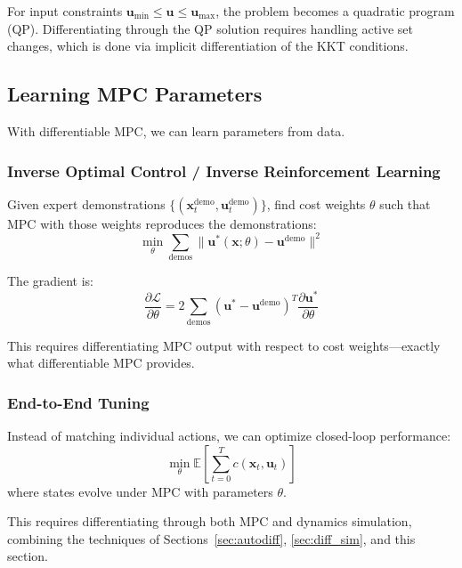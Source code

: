 For input constraints $\mathbf{u}_{\min} \leq \mathbf{u} \leq \mathbf{u}_{\max}$, the problem becomes a quadratic program (QP). Differentiating through the QP solution requires handling active set changes, which is done via implicit differentiation of the KKT conditions.

\subsection{Learning MPC Parameters}

With differentiable MPC, we can learn parameters from data.

\subsubsection{Inverse Optimal Control / Inverse Reinforcement Learning}

Given expert demonstrations $\{(\mathbf{x}_t^{\text{demo}}, \mathbf{u}_t^{\text{demo}})\}$, find cost weights $\theta$ such that MPC with those weights reproduces the demonstrations:
\begin{equation}
\min_{\theta} \sum_{\text{demos}} \| \mathbf{u}^*(\mathbf{x}; \theta) - \mathbf{u}^{\text{demo}} \|^2
\end{equation}

The gradient is:
\begin{equation}
\frac{\partial \mathcal{L}}{\partial \theta} = 2 \sum_{\text{demos}} (\mathbf{u}^* - \mathbf{u}^{\text{demo}})^T \frac{\partial \mathbf{u}^*}{\partial \theta}
\end{equation}

This requires differentiating MPC output with respect to cost weights---exactly what differentiable MPC provides.

\subsubsection{End-to-End Tuning}

Instead of matching individual actions, we can optimize closed-loop performance:
\begin{equation}
\min_{\theta} \mathbb{E}\left[ \sum_{t=0}^{T} c(\mathbf{x}_t, \mathbf{u}_t) \right]
\end{equation}
where states evolve under MPC with parameters $\theta$.

This requires differentiating through both MPC and dynamics simulation, combining the techniques of Sections~\ref{sec:autodiff}, \ref{sec:diff_sim}, and this section.

